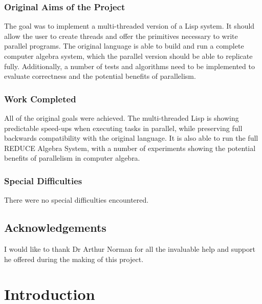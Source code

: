\documentclass[a4paper,12pt,twoside,openany]{report}
\begin{document}
\subsection*{Original Aims of the Project}

The goal was to implement a multi-threaded version of a Lisp system. It should
allow the user to create threads and offer the primitives necessary to
write parallel programs. The original language is able to build and
run a complete computer algebra system, which the parallel version should
be able to replicate fully. Additionally, a number of tests and algorithms need to
be implemented to evaluate correctness and the potential benefits of parallelism.

\subsection*{Work Completed}

All of the original goals were achieved. The multi-threaded Lisp
is showing predictable speed-ups when executing tasks in parallel,
while preserving full backwards compatibility with the original language.
It is also able to run the full REDUCE Algebra System, with a number of experiments
showing the potential benefits of parallelism in computer algebra.

\subsection*{Special Difficulties}
There were no special difficulties encountered.

\newpage

\section*{Acknowledgements}
I would like to thank Dr Arthur Norman for all the invaluable help
and support he offered during the making of this project.

\setcounter{tocdepth}{2}
\tableofcontents

\newpage


\pagestyle{headings}

\setcounter{page}{0}

\chapter{Introduction}
\label{ch:introduction}

\end{document}
